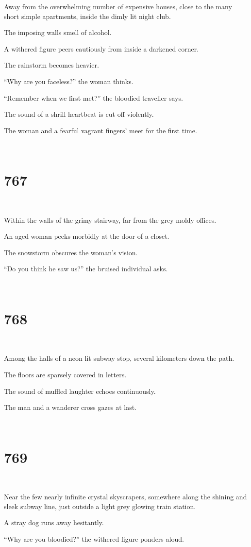 \documentclass{report}
\begin{document}
Away from the overwhelming number of expensive houses, close to the many short simple apartments, inside the dimly lit night club.

The imposing walls smell of alcohol.

A withered figure peers cautiously from inside a darkened corner.

The rainstorm becomes heavier.

``Why are you faceless?'' the woman thinks.

``Remember when we first met?'' the bloodied traveller says.

The sound of a shrill heartbeat is cut off violently.

The woman and a fearful vagrant fingers' meet for the first time.

~
\chapter*{767}
~

Within the walls of the grimy stairway, far from the grey moldy offices.

An aged woman peeks morbidly at the door of a closet.

The snowstorm obscures the woman's vision.

``Do you think he saw us?'' the bruised individual asks.

~
\chapter*{768}
~

Among the halls of a neon lit subway stop, several kilometers down the path.

The floors are sparsely covered in letters.

The sound of muffled laughter echoes continuously.

The man and a wanderer cross gazes at last.

~
\chapter*{769}
~

Near the few nearly infinite crystal skyscrapers, somewhere along the shining and sleek subway line, just outside a light grey glowing train station.

A stray dog runs away hesitantly.

``Why are you bloodied?'' the withered figure ponders aloud.
\end{document}

